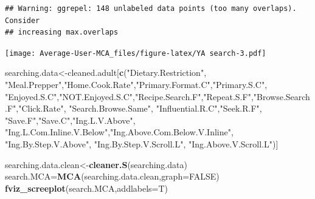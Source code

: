 \documentclass[
]{article}
\newenvironment{Shaded}{\begin{snugshade}}{\end{snugshade}}
\newcommand{\DataTypeTok}[1]{\textcolor[rgb]{0.13,0.29,0.53}{#1}}
\newcommand{\KeywordTok}[1]{\textcolor[rgb]{0.13,0.29,0.53}{\textbf{#1}}}
\newcommand{\NormalTok}[1]{#1}
\newcommand{\OtherTok}[1]{\textcolor[rgb]{0.56,0.35,0.01}{#1}}
\newcommand{\StringTok}[1]{\textcolor[rgb]{0.31,0.60,0.02}{#1}}
\begin{document}
\begin{Shaded}
\end{Shaded}

\begin{verbatim}
## Warning: ggrepel: 148 unlabeled data points (too many overlaps). Consider
## increasing max.overlaps
\end{verbatim}

\texttt{[image: Average-User-MCA\_files/figure-latex/YA search-3.pdf]}

\begin{Shaded}
\begin{Highlighting}[]
\NormalTok{searching.data<-cleaned.adult[}\KeywordTok{c}\NormalTok{(}\StringTok{"Dietary.Restriction"}\NormalTok{, }\StringTok{"Meal.Prepper"}\NormalTok{,}\StringTok{"Home.Cook.Rate"}\NormalTok{,}\StringTok{"Primary.Format.C"}\NormalTok{,}\StringTok{"Primary.S.C"}\NormalTok{,}
            \StringTok{"Enjoyed.S.C"}\NormalTok{,}\StringTok{"NOT.Enjoyed.S.C"}\NormalTok{,}\StringTok{"Recipe.Search.F"}\NormalTok{,}\StringTok{"Repeat.S.F"}\NormalTok{,}\StringTok{"Browse.Search.F"}\NormalTok{,}\StringTok{"Click.Rate"}\NormalTok{,}
            \StringTok{"Search.Browse.Same"}\NormalTok{, }\StringTok{"Influential.R.C"}\NormalTok{,}\StringTok{"Seek.R.F"}\NormalTok{, }\StringTok{"Save.F"}\NormalTok{,}\StringTok{"Save.C"}\NormalTok{,}\StringTok{"Ing.L.V.Above"}\NormalTok{,}
            \StringTok{"Ing.L.Com.Inline.V.Below"}\NormalTok{,}\StringTok{"Ing.Above.Com.Below.V.Inline"}\NormalTok{,  }\StringTok{"Ing.By.Step.V.Above"}\NormalTok{,  }\StringTok{"Ing.By.Step.V.Scroll.L"}\NormalTok{,}
            \StringTok{"Ing.Above.V.Scroll.L"}\NormalTok{)]}

\NormalTok{searching.data.clean<-}\KeywordTok{cleaner.S}\NormalTok{(searching.data)}
\NormalTok{search.MCA=}\KeywordTok{MCA}\NormalTok{(searching.data.clean,}\DataTypeTok{graph=}\OtherTok{FALSE}\NormalTok{)}
\KeywordTok{fviz_screeplot}\NormalTok{(search.MCA,}\DataTypeTok{addlabels=}\NormalTok{T)}
\end{Highlighting}
\end{Shaded}
\end{document}
